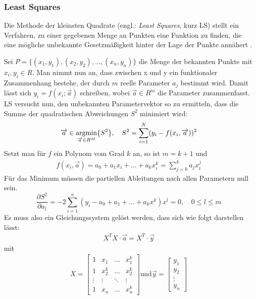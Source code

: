 \subsubsection{Least Squares}
\label{subsubsec:least}

Die Methode der kleinsten Quadrate (engl.: \emph{Least Squares}, kurz LS) stellt ein Verfahren, zu einer gegebenen Menge an Punkten eine Funktion zu finden, die eine mögliche unbekannte Gesetzmäßigkeit hinter der Lage der Punkte annähert \cite{lsq_wolfram}.

Sei $P = \{(x_1, y_1), (x_2, y_2), ..., (x_n, y_n)\}$ die Menge der bekannten Punkte mit $x_i, y_i \in R$. Man nimmt nun an, dass zwischen x und y ein funktionaler Zusammenhang bestehe, der durch $m$ reelle Parameter $a_j$ bestimmt wird. Damit lässt sich $y_i = f(x_i; \overrightarrow{a})$ schreiben, wobei $\overrightarrow{a} \in R^m$ die Parameter zusammenfasst. LS versucht nun, den unbekannten Parametervektor so zu ermitteln, dass die Summe der quadratischen Abweichungen $S^2$ minimiert wird:
\begin{equation}
\begin{split}
\overrightarrow{a} \in \mathop{\mathrm{argmin}}_{\overrightarrow{a} \in R^M} \{ S^2 \}, \quad
S^2 =  \sum_{i=1}^{N} (y_i - f(x_i, \overrightarrow{a}))^2
\end{split}
\label{eq:opt}
\end{equation}
Setzt man für $f$ ein Polynom vom Grad $k$ an, so ist $m = k+1$ und
\begin{gather}
f(x_i, \overrightarrow{a}) = a_0 + a_1 x_i + \dots + a_k x_i^k = \sum_{j = 0}^{k} a_j x_i^j %
\end{gather}
Für das Minimum müssen die partiellen Ableitungen nach allen Parametern null sein.
\begin{equation}
\frac{\partial S^2}{\partial a_l} = -2 \sum_{i=1}^{n}(y_i - a_0 + a_1 + \dots + a_k x^k) x^l = 0, \quad 0 \leq l \leq m
\end{equation}
Es muss also ein Gleichungssystem gelöst werden, dass sich wie folgt darstellen lässt:
\begin{gather}
X^T X \cdot \overrightarrow{a} = X^T \cdot
\overrightarrow{y} \label{eq:solution}
\end{gather}
mit 
\begin{gather}
X =
\begin{bmatrix}
1 & x_1 & \dots & x_1^k \\
1 & x_2^k & \dots & x_2^k \\
\vdots & \vdots & \ddots & \vdots \\
1 & x_n & \dots & x_n^k
\end{bmatrix}
\text{und} \overrightarrow{y} = \begin{bmatrix}
y_1 \\ y_2 \\ \vdots \\ y_n
\end{bmatrix}
\end{gather}
